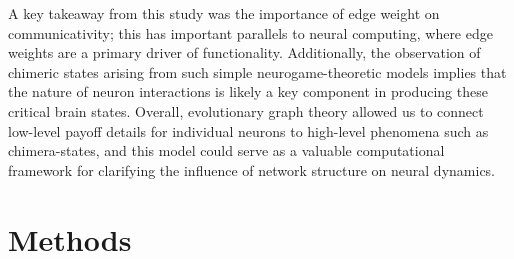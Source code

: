 \documentclass[pdflatex,lineno,referee,sn-nature]{sn-jnl}
\begin{document}
A key takeaway from this study was the importance
of edge weight on communicativity;
this has important parallels to neural computing,
where edge weights are a primary driver of functionality.
Additionally, the observation of chimeric states
arising from such simple neurogame-theoretic models
implies that the nature of neuron interactions is likely
a key component in producing these critical brain states.
Overall, evolutionary graph theory allowed us
to connect low-level payoff details for individual neurons
to high-level phenomena such as chimera-states,
and this model could serve as a valuable computational framework
for clarifying the influence of network structure on neural dynamics.

\section{Methods}\label{sec:methods}
\end{document}
